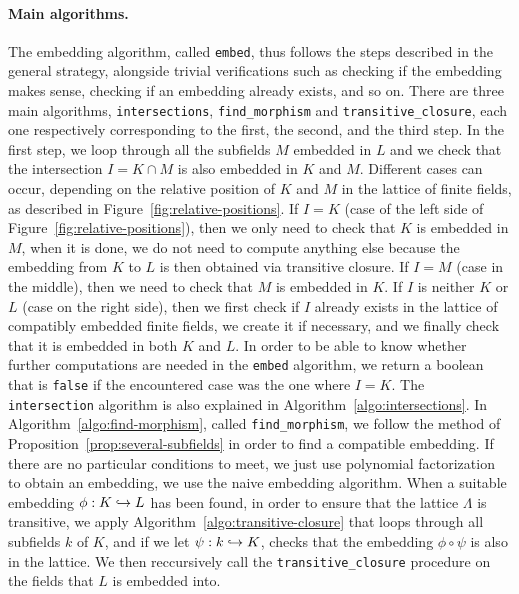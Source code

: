 \paragraph{Main algorithms.} The embedding algorithm, called \texttt{embed}, thus follows the steps
described in the general strategy, alongside trivial verifications such as
checking if the embedding makes sense, checking if an embedding already exists,
and so on. There are three main algorithms, \texttt{intersections},
\texttt{find\_morphism} and \texttt{transitive\_closure}, each one respectively
corresponding to the first, the second, and the third step. In the first step,
we loop through all the subfields $M$ embedded in $L$ and we check that the
intersection $I = K\cap M$ is also embedded in $K$ and $M$. Different cases can
occur, depending on the relative position of $K$ and $M$ in the lattice of
finite fields, as described in Figure~\ref{fig:relative-positions}. If $I=K$
(case of the left side of Figure~\ref{fig:relative-positions}), then we only
need to check that $K$ is embedded in $M$, when
it is done, we do not need to compute anything else because the embedding from
$K$ to $L$ is then obtained via transitive closure. If $I=M$ (case in the
middle), then we need to check that $M$ is embedded in $K$. If $I$ is neither
$K$ or $L$ (case on the right side), then we first check if $I$ already exists
in the lattice of compatibly embedded finite fields, we create it if necessary,
and we finally check that it is embedded in both $K$ and $L$. In order to be
able to know whether further computations are needed in the \texttt{embed}
algorithm, we return a boolean that is \texttt{false} if the encountered case
was the one where $I=K$. The \texttt{intersection} algorithm is also explained
in Algorithm~\ref{algo:intersections}. In Algorithm~\ref{algo:find-morphism},
called \texttt{find\_morphism}, we follow the method of
Proposition~\ref{prop:several-subfields} in order to find a compatible
embedding. If there are no particular conditions to meet, we just use polynomial
factorization to obtain an embedding, \ie we use the naive embedding algorithm.
When a suitable embedding $\phi:K\hookrightarrow L$ has been found, in order to ensure that
the lattice $\Lambda$ is transitive, we apply
Algorithm~\ref{algo:transitive-closure} that loops through all subfields $k$ of
$K$, and if we let $\psi:k\hookrightarrow K$, checks that the embedding $\phi\circ\psi$ is
also in the lattice. We then reccursively call the \texttt{transitive\_closure}
procedure on the fields that $L$ is embedded into.
